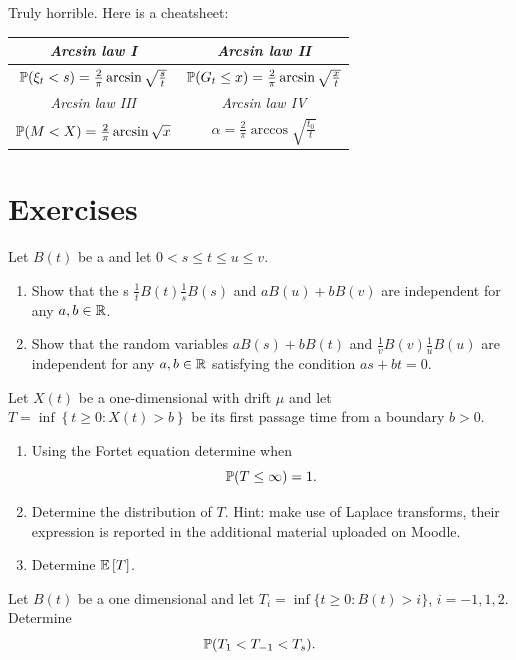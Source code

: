 \documentclass[12pt]{report}
\begin{document}
Truly horrible. Here is a cheatsheet:
\begin{center}
			\begin{tabular}{|c|c|}
				\hline
	\emph{Arcsin law I}&\emph{Arcsin law II}\\
	\hline
	$\mathbb{P}(\xi_{t}<s)=\frac{2}{\pi}\arcsin\sqrt{\frac{s}{t}}$&$\mathbb{P}(G_{t}\leq x)=\frac{2}{\pi}\arcsin\sqrt{\frac{x}{t}}$\\
	\hline
	\emph{Arcsin law III}&\emph{Arcsin law IV}\\
	\hline
	$\mathbb{P}({M}<X)=\frac{2}{\pi}\arcsin\sqrt{x}$&$\alpha=\frac{2}{\pi}\arccos\sqrt{\frac{t_{0}}{t}}$\\
	\hline
\end{tabular}
\end{center}
\section*{Exercises}
\label{sec:exer3}
\begin{exercise}
	Let $B(t)$ be a \bwm{} and let $0<s\leq t\leq u\leq v$.
	\begin{enumerate}
		\item Show that the \rv s $\frac{1}{t}B(t)\frac{1}{s}B(s)$ and $aB(u)+bB(v)$ are independent for any $a,b\in\mathbb{R}$.
		\item Show that the random variables $aB(s)+bB(t)$ and $\frac{1}{v}B(v)\frac{1}{u}B(u)$ are independent for any $a,b\in\mathbb{R}$ satisfying the condition $as+bt=0$.
	\end{enumerate}
\end{exercise}
\begin{exercise}
	Let $X(t)$ be a one-dimensional \bwm{} with drift $\mu$ and let $T=\inf\left\{t\geq0:X(t)>b\right\}$ be its first passage time from a boundary $b>0$.
	\begin{enumerate}
		\item Using the Fortet equation determine when
		\begin{equation*}
			\mathbb{P}(T\leq\infty)=1.
		\end{equation*}
		\item Determine the distribution of $T$. Hint: make use of Laplace transforms, their expression is reported in the additional material uploaded on Moodle.
		\item Determine $\mathbb{E}\left[T\right]$.
	\end{enumerate}
\end{exercise}
\begin{exercise}
	Let $B(t)$ be a one dimensional \bwm{} and let $T_{i}=\inf\{t\geq 0: B(t)>i\}$, $i=-1,1,2$. Determine 
	\begin{equation*}
		\mathbb{P}(T_{1}<T_{-1}<T_{s}).
	\end{equation*}
\end{exercise}
\end{document}
